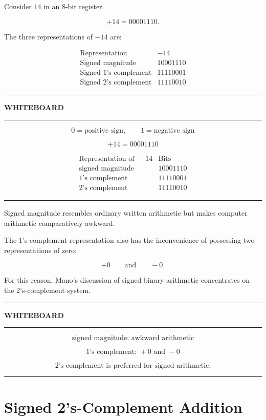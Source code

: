 \documentclass[11pt]{article}
\newenvironment{whiteboard}
{
    \par\medskip
    \begin{center}
    \begin{minipage}{0.94\textwidth}
    \hrule
    \vspace{0.4em}
    \textbf{\large WHITEBOARD}
    \vspace{0.3em}
    \hrule
    \vspace{0.7em}
}
{
    \vspace{0.5em}
    \hrule
    \end{minipage}
    \end{center}
    \medskip
}
\begin{document}
Consider \(14\) in an 8-bit register.

\[
+14=00001110.
\]

The three representations of \(-14\) are:

\[
\begin{array}{c|c}
\text{Representation} & -14 \\ \hline
\text{Signed magnitude} & 10001110\\
\text{Signed 1's complement} & 11110001\\
\text{Signed 2's complement} & 11110010
\end{array}
\]

\begin{whiteboard}
\[
0=\text{positive sign},
\qquad
1=\text{negative sign}
\]

\[
+14=00001110
\]

\[
\begin{array}{c|c}
\text{Representation of }-14 & \text{Bits}\\ \hline
\text{signed magnitude} & 10001110\\
\text{1's complement} & 11110001\\
\text{2's complement} & 11110010
\end{array}
\]
\end{whiteboard}

Signed magnitude resembles ordinary written arithmetic but makes computer
arithmetic comparatively awkward.

The 1's-complement representation also has the inconvenience of possessing
two representations of zero:

\[
+0
\qquad\text{and}\qquad
-0.
\]

For this reason, Mano's discussion of signed binary arithmetic concentrates
on the 2's-complement system.

\begin{whiteboard}
\[
\text{signed magnitude: awkward arithmetic}
\]

\[
\text{1's complement: }+0\text{ and }-0
\]

\[
\boxed{\text{2's complement is preferred for signed arithmetic.}}
\]
\end{whiteboard}

\section{Signed 2's-Complement Addition}
\end{document}
